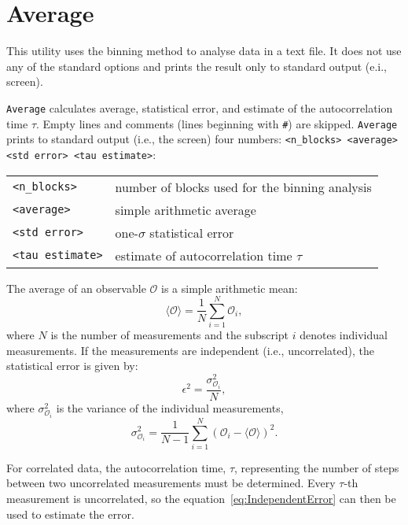 \section{Average} \label{sec:Average}

This utility uses the binning method to analyse data in a text file. It
does not use any of the standard options and prints the result only to
standard output (e.i., screen).

\texttt{Average} calculates average, statistical error, and estimate of the
autocorrelation time $\tau$. Empty lines and comments (lines beginning with
\texttt{\#}) are skipped. \texttt{Average} prints to standard output (i.e.,
the screen) four numbers: \texttt{<n\_blocks> <average> <std error> <tau
estimate>}:
\begin{longtable}{ll}
  \toprule
  \texttt{<n\_blocks>} & number of blocks used for the binning analysis \\
  \texttt{<average>} & simple arithmetic average \\
  \texttt{<std error>} & one-$\sigma$ statistical error \\
  \texttt{<tau estimate>} & estimate of autocorrelation time $\tau$ \\
  \bottomrule
\end{longtable}

The average of an observable $\mathcal{O}$ is a simple
arithmetic mean:
\begin{equation} \label{eq:Average} %
  \langle\mathcal{O}\rangle = \frac{1}{N} \sum^N_{i=1} \mathcal{O}_i,
\end{equation} %
where $N$ is the number of measurements and the subscript $i$ denotes
individual measurements. If the measurements are independent (i.e.,
uncorrelated), the statistical error is given by:
\begin{equation} \label{eq:IndependentError} %
  \epsilon^2 =
    \frac{\sigma^2_{\mathcal{O}_i}}{N},
\end{equation} %
where $\sigma^2_{\mathcal{O}_i}$
is the variance of the individual
measurements,
\begin{equation} %
  \sigma^2_{\mathcal{O}_i} = \frac{1}{N-1} \sum^N_{i=1} (\mathcal{O}_i -
  \langle\mathcal{O}\rangle)^2.
\end{equation} %

For correlated data, the autocorrelation time,
$\tau$, representing the number of steps between two uncorrelated
measurements must be determined. Every
$\tau$-th measurement is uncorrelated, so the
equation~\eqref{eq:IndependentError} can then be used to estimate the
error.


